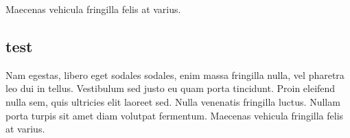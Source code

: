 {{        Maecenas vehicula fringilla felis at varius.
    }

    \subsection{test}
    {
        Nam egestas, libero eget sodales sodales, enim massa fringilla nulla, vel pharetra leo dui in tellus.
        Vestibulum sed justo eu quam porta tincidunt. Proin eleifend nulla sem,
        quis ultricies elit laoreet sed. Nulla venenatis fringilla luctus.
        Nullam porta turpis sit amet diam volutpat fermentum.
        Maecenas vehicula fringilla felis at varius.
    }
}
